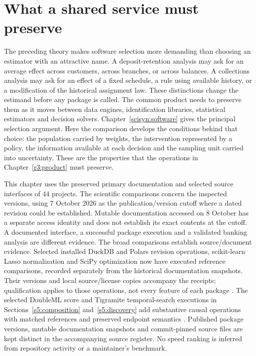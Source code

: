 \chapter{What a shared service must preserve}
\label{r3:software}

The preceding theory makes software selection more demanding than choosing
an estimator with an attractive name. A deposit-retention analysis may ask
for an average effect across customers, across branches, or across balances.
A collections analysis may ask for an effect of a fixed schedule, a rule
using available history, or a modification of the historical assignment
law. These distinctions change the estimand before any package is called.
The common product needs to preserve them as it moves between data engines,
identification libraries, statistical estimators and decision solvers.
Chapter~\ref{scisyn:software} gives the principal selection argument. Here the
comparison develops the conditions behind that choice: the population carried
by weights, the intervention represented by a policy, the information available
at each decision and the sampling unit carried into uncertainty. These are the
properties that the operations in Chapter~\ref{r3:product} must preserve.

This chapter uses the preserved primary documentation and selected source
interfaces of 44 projects. The scientific comparisons concern the inspected
versions, using 7 October 2026 as the publication/version cutoff where a
dated revision could be established. Mutable documentation accessed on
8 October has a separate access identity and does not establish its exact
contents at the cutoff. A documented interface, a successful
package execution and a validated banking analysis are different evidence.
The broad comparisons establish source/document evidence. Selected installed
DuckDB and Polars revision operations, scikit-learn Lasso normalization and
SciPy optimization now have executed reference comparisons, recorded
separately from the historical documentation snapshots. Their versions and
local source/license copies accompany the receipts; qualification applies
to those operations, not every feature of each package
\citep{runtime_duckdb,runtime_polars,runtime_scikit_learn,runtime_scipy,runtime_numpy}.
The selected DoubleML score and Tigramite temporal-search executions in
Sections~\ref{s5:composition} and~\ref{s5:discovery} add substantive causal
operations with matched references and preserved endpoint semantics
\citep{runtime_doubleml_scope,runtime_tigramite_scope}.
Published package versions, mutable documentation snapshots and
commit-pinned source files are kept distinct in the accompanying source
register. No speed ranking is inferred from repository activity or a
maintainer's benchmark.

